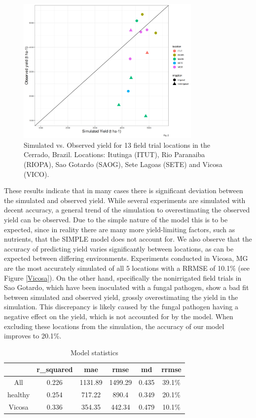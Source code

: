 \documentclass[11pt]{article}
\begin{document}
\begin{figure}[htbp]
\centering
\includegraphics[width=0.8\textwidth]{../results/experimental-data/2023-02-18_Obs_Sim_all_415.png}
\caption{\label{obs-sim}Simulated vs. Observed yield for 13 field trial locations in the Cerrado, Brazil. Locations: Itutinga (ITUT), Rio Paranaiba (RIOPA), Sao Gotardo (SAOG), Sete Lagoas (SETE) and Vicosa (VICO).}
\end{figure}

These results indicate that in many cases there is significant deviation between the simulated and observed yield. While several experiments are simulated with decent accuracy, a general trend of the simulation to overestimating the observed yield can be observed. Due to the simple nature of the model this is to be expected, since in reality there are many more yield-limiting factors, such as nutrients, that the SIMPLE model does not account for.
We also observe that the accuracy of predicting yield varies significantly between locations, as can be expected between differing environments. Experiments conducted in Vicosa, MG are the most accurately simulated of all 5 locations with a RRMSE of 10.1\% (see Figure \ref{Vicosa}).
On the other hand, specifically the nonirrigated field trials in Sao Gotardo, which  have been inoculated with a fungal pathogen, show a bad fit between simulated and observed yield, grossly overestimating the yield in the simulation. This discrepancy is likely caused by the fungal pathogen having a negative effect on the yield, which is not accounted for by the model. When excluding these locations from the simulation, the accuracy of our model improves to 20.1\%.

\begin{table}[htbp]
\caption{\label{stats}Model statistics}
\centering
\begin{tabular}{|c|c|c|c|c|c|}
\hline
 & r\_squared & mae & rmse & md & rrmse\\
\hline
All & 0.226 & 1131.89 & 1499.29 & 0.435 & 39.1\%\\
healthy & 0.254 & 717.22 & 890.4 & 0.349 & 20.1\%\\
Vicosa & 0.336 & 354.35 & 442.34 & 0.479 & 10.1\%\\
\hline
\end{tabular}
\end{table}
\end{document}
